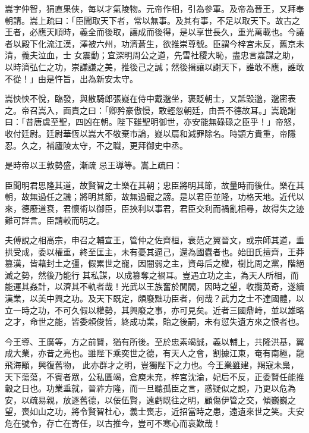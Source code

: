 \begin{pinyinscope}
 嵩字仲智，狷直果俠，每以才氣陵物。元帝作相，引為參軍。及帝為晉王，又拜奉朝請。嵩上疏曰：「臣聞取天下者，常以無事。及其有事，不足以取天下。故古之王者，必應天順時，義全而後取，讓成而後得，是以享世長久，重光萬載也。今議者以殿下化流江漢，澤被六州，功濟蒼生，欲推崇尊號。臣謂今梓宮未反，舊京未清，義夫泣血，士
 女震動；宜深明周公之道，先雪社稷大恥，盡忠言嘉謀之助，以時濟弘仁之功，崇謙謙之美，推後己之誠；然後揖讓以謝天下，誰敢不應，誰敢不從！」由是忤旨，出為新安太守。



 嵩怏怏不悅，臨發，與散騎郎張嶷在侍中戴邈坐，褒貶朝士，又詆毀邈，邈密表之。帝召嵩入，面責之曰：「卿矜豪傲慢，敢輕忽朝廷，由吾不德故耳。」嵩跪謝曰：「昔唐虞至聖，四凶在朝。陛下雖聖明御世，亦安能無碌碌之臣乎！」帝怒，收付廷尉。廷尉華恆以嵩大不敬棄市論，嶷以扇和減罪除名。時顗方貴重，帝隱忍。久之，補廬陵太守，不之職，更拜御史中丞。



 是時帝以王敦勢盛，漸疏
 忌王導等。嵩上疏曰：



 臣聞明君思隆其道，故賢智之士樂在其朝；忠臣將明其節，故量時而後仕。樂在其朝，故無過任之譏；將明其節，故無過寵之謗。是以君臣並隆，功格天地。近代以來，德廢道衰，君懷術以御臣，臣挾利以事君，君臣交利而禍亂相尋，故得失之迹難可詳言。臣請較而明之。



 夫傅說之相高宗，申召之輔宣王，管仲之佐齊桓，衰范之翼晉文，或宗師其道，垂拱受成，委以權重，終至匡主，未有憂其逼己，還為國蠹者也。始田氏擅齊，王莽篡漢，皆藉封土之彊，假累世之寵，因闇弱之主，資母后之權，樹比周之黨，階絕滅之勢，然後乃能行
 其私謀，以成篡奪之禍耳。豈遇立功之主，為天人所相，而能運其姦計，以濟其不軌者哉！光武以王族奮於閭閻，因時之望，收攬英奇，遂續漢業，以美中興之功。及天下既定，頗廢黜功臣者，何哉？武力之士不達國體，以立一時之功，不可久假以權勢，其興廢之事，亦可見矣。近者三國鼎峙，並以雄略之才，命世之能，皆委賴俊哲，終成功業，貽之後嗣，未有愆失遺方來之恨者也。



 今王導、王廣等，方之前賢，猶有所後。至於忠素竭誠，義以輔上，共隆洪基，翼成大業，亦昔之亮也。雖陛下乘奕世之德，有天人之會，割據江東，奄有南極，龍飛海顒，興復舊物，
 此亦群才之明，豈獨陛下之力也。今王業雖建，羯寇未梟，天下蕩蕩，不賓者眾，公私匱竭，倉庾未充，梓宮沈淪，妃后不反，正委賢任能推轂之日也。功業垂就，晉祚方隆，而一旦聽孤臣之言，惑疑似之說，乃更以危為安，以疏易親，放逐舊德，以佞伍賢，遠虧既往之明，顧傷伊管之交，傾巍巍之望，喪如山之功，將令賢智杜心，義士喪志，近招當時之患，遠遺來世之笑。夫安危在號令，存亡在寄任，以古推今，豈可不寒心而哀歎哉！




\end{pinyinscope}
